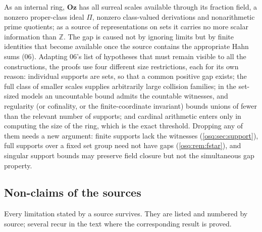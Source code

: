\documentclass[11pt,letterpaper]{article}
\numberwithin{equation}{section}
\theoremstyle{definition}
\theoremstyle{remark}
\theoremstyle{plain}
\newcommand{\Oz}{\mathbf{Oz}}
\newcommand{\Z}{\mathbb Z}
\begin{document}
As an internal ring, $\Oz$ has all surreal scales available through its fraction field, a nonzero
proper-class ideal $\Pi$, nonzero class-valued derivations and nonarithmetic prime quotients; as a
source of representations on sets it carries no more scalar information than $\Z$. The gap is caused
not by ignoring limits but by finite identities that become available once the source contains the
appropriate Hahn sums (06). Adapting 06's list of hypotheses that must remain visible to all the
constructions, the proofs use four different size restrictions, each for its own reason: individual supports are sets, so that a common positive gap exists; the full class of smaller
scales supplies arbitrarily large collision families; in the set-sized models an uncountable bound
admits the countable witnesses, and regularity (or cofinality, or the finite-coordinate invariant)
bounds unions of fewer than the relevant number of supports; and cardinal arithmetic enters only in
computing the size of the ring, which is the exact threshold. Dropping any of them needs a new
argument: finite supports lack the witnesses (\cref{osq:sec:support}), full supports over a fixed set
group need not have gaps (\cref{osq:rem:fstar}), and singular support bounds may preserve field closure
but not the simultaneous gap property.

\subsection{Non-claims of the sources}\label{osq:sub:nonclaims}
Every limitation stated by a source survives. They are listed and numbered by source;
several recur in the text where the corresponding result is proved.
\end{document}
